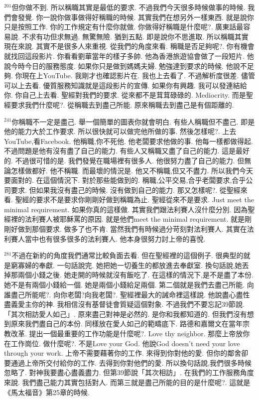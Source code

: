 \documentclass{book}
\begin{document}
$^{201}$但你做不到.
所以稱職其實是最低的要求.
不過我們今天很多時候做事的時候.
我們會發覺.
你一說你做事做得好稱職的時候.
其實我們在想另外一樣東西.
就是說你只是按照工作.
你的工作規定有什麼你就做.
你做得好稱職是什麼呢?.
廣東話最容易說.
不求有功但求無過.
無驚無險.
猶到五點.
即是說你不思進取.
所以稱職其實現在來說.
其實不是很多人來重視.
從我們的角度來看.
稱職是否足夠呢?.
你有機會就找回這段影片.
你看看劉華當年的樣子多帥.
他為香港旅遊協會做了一段短片.
他說今時今日的服務態度.
如果你只是做到媽媽夫婦.
勉強達到要求的時候.
他說不足夠.
你現在上YouTube.
我剛才也確認影片在.
我也上去看了.
不過解析度很差.
儘管可以上去看.
優質服務知識就是這段影片的宣傳.
如果你有興趣.
我可以發連結給你.
你自己上去看.
聖經對我們的要求.
從來都不是茸茸碌碌的.
Mediocrity.
而是聖經要求我們什麼呢?.
從稱職去到盡己所能.
原來稱職去到盡己是有個距離的.

$^{241}$你稱職不一定是盡己.
舉一個簡單的圖表你就會明白.
有些人稱職但不盡己.
即是他的能力大於工作要求.
所以很快就可以做完他所做的事.
然後怎樣呢?.
上去YouTube,看Facebook.
他稱職,你不死他.
他老闆要求他做的事.
他每一樣都做得起.
不過問題是他有沒有盡了自己的能力.
有些人又稱職又盡了自己的能力.
這是最好的.
不過很可惜的是.
我們發覺在職場裡有很多人.
他很努力盡了自己的能力.
但無論怎樣做都好.
他不稱職.
而最壞的情況是.
他又不稱職,但又不盡力.
所以我們今天要面對的.
在這個情況下.
對於那些能做到的.
稱職,公平交易,合乎老闆要求,合乎公司要求.
但如果我沒有盡己的時候.
沒有做到自己的能力.
那又怎樣呢?.
從聖經來看.
聖經的要求不是要求你剛剛好做到稱職為止.
聖經從來不是要求.
Just meet the minimal requirement.
如果你真的這樣做.
其實我們跟法利賽人沒什麼分別.
因為聖經裡的法利賽人被耶穌罵的原因.
就是他們meet the minimal requirement.
就是剛剛好做到那個要求.
做多了也不肯.
當然我們有時候過分苛刻對法利賽人.
其實在法利賽人當中也有很多很多的法利賽人.
他本身很努力討上帝的喜悅.

$^{281}$不過在新約的角度我們通常比較負面去看.
但在聖經裡的這個例子.
很典型的就是窮寡婦的奉獻.
一句話說完.
她把她一切養生的都放進去奉獻室.
換句話說,她丟掉那兩個小錢之後.
她走開的時候就沒有飯吃了.
在這樣的情況下,是不是盡了本份.
她不是有兩個小錢給一個.
她是兩個小錢給足兩個.
第二個就是我們去盡己所能.
向誰盡己所能呢?.
向你老闆?向我老闆?.
聖經裡最大的誡命裡這樣說.
他說盡心盡性盡義愛主你的神.
我相信沒有基督徒會質疑這個對象.
不過我們不要忘記39節說.
「其次相訪愛人如己」.
原來盡己對神是必然的.
是你和我都知道的.
但我們沒有想到原來我們盡自己的本份.
同樣放在愛人如己的範疇底下.
路德和嘉爾文在當年宗教改革.
提出一個最重要的工作功能是什麼呢?.
Love thy neighbor.
那麼上帝放你在工作崗位.
做什麼呢?.
不是Love your God.
他說God doesn't need your love through your work.
上帝不需要藉著你的工作.
來得到你對他的愛.
但你的鄰舍卻要通過上帝所交付給你的工作.
去得到你對他們的愛.
所以換句話說,我們很多時候忽略了.
對神我要盡心盡義盡力.
但第39節說「其次相訪」.
在我們的工作服務角度來說.
我們盡己能力其實包括對人.
而第三就是盡己所能的目的是什麼呢?.
這就是《馬太福音》第25章的時候.
\end{document}
